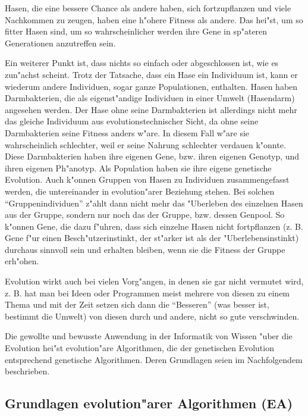 Hasen, die eine bessere Chance als andere haben, sich fortzupflanzen und viele Nachkommen zu zeugen, haben eine h"ohere Fitness als andere. Das hei"st, um so fitter Hasen sind, um so wahrscheinlicher werden ihre Gene in sp"ateren Generationen anzutreffen sein.

Ein weiterer Punkt ist, dass nichts so einfach oder abgeschlossen ist, wie es zun"achst scheint. Trotz der Tatsache, dass ein Hase ein Individuum ist, kann er wiederum andere Individuen, sogar ganze Populationen, enthalten. Hasen haben Darmbakterien, die als eigenst"andige Individuen in einer Umwelt (Hasendarm) angesehen werden. Der Hase ohne seine Darmbakterien ist allerdings nicht mehr das gleiche Individuum aus evolutionstechnischer Sicht, da ohne seine Darmbakterien seine Fitness anders w"are. In diesem Fall w"are sie wahrscheinlich schlechter, weil er seine Nahrung schlechter verdauen k"onnte. Diese Darmbakterien haben ihre eigenen Gene, bzw. ihren eigenen Genotyp, und ihren eigenen Ph"anotyp. Als Population haben sie ihre eigene genetische Evolution. Auch k"onnen Gruppen von Hasen zu Individuen zusammengefasst werden, die untereinander in evolution"arer Beziehung stehen. Bei solchen ``Gruppenindividuen'' z"ahlt dann nicht mehr das "Uberleben des einzelnen Hasen aus der Gruppe, sondern nur noch das der Gruppe, bzw. dessen Genpool. So k"onnen Gene, die dazu f"uhren, dass sich einzelne Hasen nicht fortpflanzen (z. B. Gene f"ur einen Besch"utzerinstinkt, der st"arker ist als der "Uberlebensinstinkt) durchaus sinnvoll sein und erhalten bleiben, wenn sie die Fitness der Gruppe erh"ohen. 

\bigskip\noindent
Evolution wirkt auch bei vielen Vorg"angen, in denen sie gar nicht vermutet wird, z. B. hat man bei Ideen oder Programmen meist mehrere von diesen zu einem Thema und mit der Zeit setzen sich dann die ``Besseren'' (was besser ist, bestimmt die Umwelt) von diesen durch und andere, nicht so gute verschwinden.

\bigskip\noindent
Die gewollte und bewusste Anwendung in der Informatik von Wissen "uber die Evolution hei"st evolution"are Algorithmen, die der genetischen Evolution entsprechend genetische Algorithmen. Deren Grundlagen seien im Nachfolgendem beschrieben.


\subsection{Grundlagen evolution"arer Algorithmen (EA)}

